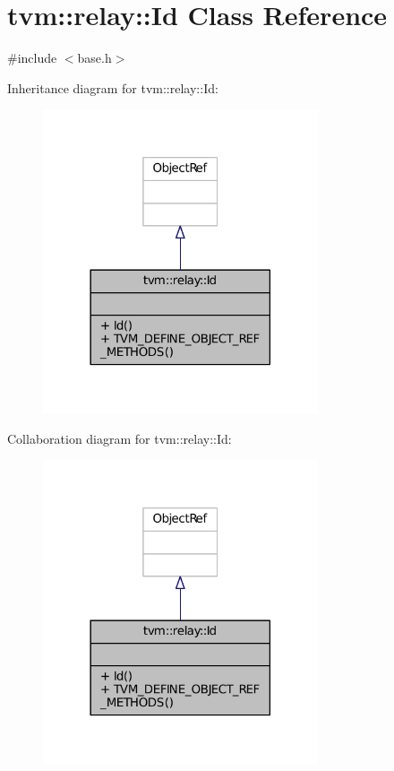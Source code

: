 \hypertarget{classtvm_1_1relay_1_1Id}{}\section{tvm\+:\+:relay\+:\+:Id Class Reference}
\label{classtvm_1_1relay_1_1Id}


{\ttfamily \#include $<$base.\+h$>$}



Inheritance diagram for tvm\+:\+:relay\+:\+:Id\+:
\nopagebreak
\begin{figure}[H]
\begin{center}
\leavevmode
\includegraphics[width=230pt]{classtvm_1_1relay_1_1Id__inherit__graph}
\end{center}
\end{figure}


Collaboration diagram for tvm\+:\+:relay\+:\+:Id\+:
\nopagebreak
\begin{figure}[H]
\begin{center}
\leavevmode
\includegraphics[width=230pt]{classtvm_1_1relay_1_1Id__coll__graph}
\end{center}
\end{figure}
